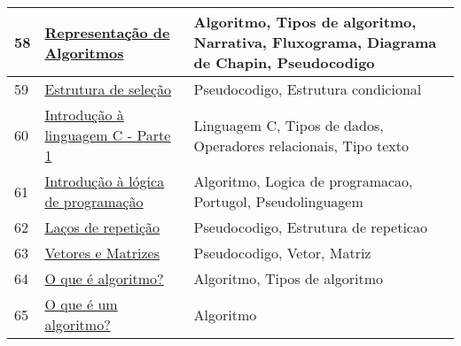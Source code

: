 \begin{longtable}{| p{} | p{} | p{} |}
58  & \href{http://www.omundodaprogramacao.com/representacao-de-algoritmos/}{\color{blue} Representação de Algoritmos                                                         } & Algoritmo, Tipos de algoritmo, Narrativa, Fluxograma, Diagrama de Chapin, Pseudocodigo                                                            \\ \hline
59  & \href{http://www.rafaeltoledo.net/estruturas-de-selecao/}{\color{blue} Estrutura de seleção                                                                } & Pseudocodigo, Estrutura condicional                                                                                                               \\ \hline
60  & \href{http://www.rafaeltoledo.net/introducao-a-linguagem-c-parte-i/}{\color{blue} Introdução à linguagem C - Parte 1                                                  } & Linguagem C, Tipos de dados, Operadores relacionais, Tipo texto                                                                                   \\ \hline
61  & \href{http://www.rafaeltoledo.net/introducao-a-logica-de-programacao/}{\color{blue} Introdução à lógica de programação                                                  } & Algoritmo, Logica de programacao, Portugol, Pseudolinguagem                                                                                       \\ \hline
62  & \href{http://www.rafaeltoledo.net/lacos-de-repeticao/}{\color{blue} Laços de repetição                                                                  } & Pseudocodigo, Estrutura de repeticao                                                                                                              \\ \hline
63  & \href{http://www.rafaeltoledo.net/vetores-e-matrizes/}{\color{blue} Vetores e Matrizes                                                                  } & Pseudocodigo, Vetor, Matriz                                                                                                                       \\ \hline
64  & \href{http://www.tecmundo.com.br/programacao/2082-o-que-e-algoritmo-.htm}{\color{blue} O que é algoritmo?                                                                  } & Algoritmo, Tipos de algoritmo                                                                                                                     \\ \hline
65  & \href{http://www.tiexpert.net/programacao/algoritmo/o-que-e-um-algoritmo.php}{\color{blue} O que é um algoritmo?                                                               } & Algoritmo                                                                                                                                         \\ \hline

\end{longtable}
